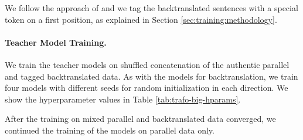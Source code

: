 We follow the approach of \citet{caswell-etal-2019-tagged} and we tag the
backtranslated sentences with a special token on a first position, as explained
in Section \ref{sec:training:methodology}.

\paragraph{Teacher Model Training.}  We train the teacher models on shuffled
concatenation of the authentic parallel and tagged backtranslated data. As with
the models for backtranslation, we train four models with different seeds for
random initialization in each direction. We show the hyperparameter values in
Table \ref{tab:trafo-big-hparams}.

After the training on mixed parallel and backtranslated data converged, we
continued the training of the models on parallel data only.


